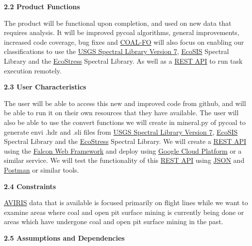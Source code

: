 \documentclass[a4paper,12pt]{article}
\begin{document}
\noindent \textbf{2.2 Product Functions}\newline


\noindent The product will be functional upon completion, and used on new data that requires analysis. It will be improved pycoal algorithms, general improvements, increased code coverage, bug fixes and  \href{http://eecs.oregonstate.edu/capstone/submission/?page=preview\&pid=320}{COAL-FO} will also focus on enabling our classifications to use the \href{https://speclab.cr.usgs.gov/spectral-lib.html}{USGS Spectral Library Version 7}, \href{https://ecosis.org/}{EcoSIS} Spectral Library and the \href{https://speclib.jpl.nasa.gov/}{EcoStress} Spectral Library. As well as a \href{https://restfulapi.net/}{REST API} to run task execution remotely. \newline


\noindent \textbf{2.3 User Characteristics}\newline


\noindent The user will be able to access this new and improved code from github, and will be able to run it on their own resources that they have available.\newline
\noindent The user will also be able to use the convert functions we will create in mineral.py of pycoal to generate envi .hdr and .sli files from \href{https://speclab.cr.usgs.gov/spectral-lib.html}{USGS Spectral Library Version 7}, \href{https://ecosis.org/}{EcoSIS} Spectral Library and the \href{https://speclib.jpl.nasa.gov/}{EcoStress} Spectral Library. We will create a \href{https://restfulapi.net/}{REST API} using the \href{https://falcon.readthedocs.io/en/stable/}{Falcon Web Framework} and deploy using \href{https://cloud.google.com/}{Google Cloud Platform} or a similar service. We will test the functionality of this \href{https://restfulapi.net/}{REST API} using \href{https://www.json.org/}{JSON} and \href{https://www.getpostman.com/}{Postman} or similar tools. \newline


\noindent \textbf{2.4 Constraints}\newline

\noindent \href{https://aviris.jpl.nasa.gov/}{AVIRIS} data that is available is focused primarily on flight lines while we want to examine areas where coal and open pit surface mining is currently being done or areas which have undergone coal and open pit surface mining in the past. \newline


\noindent \textbf{2.5 Assumptions and Dependencies}\newline
\end{document}
